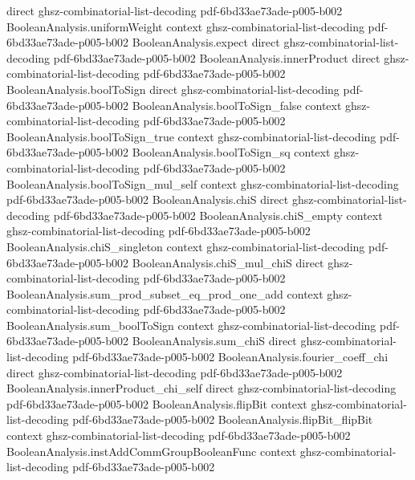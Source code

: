\begin{lemma}
  {direct}
  {ghsz-combinatorial-list-decoding}
  {pdf-6bd33ae73ade-p005-b002}
\proofstep
  {BooleanAnalysis.uniformWeight}
  {context}
  {ghsz-combinatorial-list-decoding}
  {pdf-6bd33ae73ade-p005-b002}
\proofstep
  {BooleanAnalysis.expect}
  {direct}
  {ghsz-combinatorial-list-decoding}
  {pdf-6bd33ae73ade-p005-b002}
\proofstep
  {BooleanAnalysis.innerProduct}
  {direct}
  {ghsz-combinatorial-list-decoding}
  {pdf-6bd33ae73ade-p005-b002}
\proofstep
  {BooleanAnalysis.boolToSign}
  {direct}
  {ghsz-combinatorial-list-decoding}
  {pdf-6bd33ae73ade-p005-b002}
\proofstep
  {BooleanAnalysis.boolToSign_false}
  {context}
  {ghsz-combinatorial-list-decoding}
  {pdf-6bd33ae73ade-p005-b002}
\proofstep
  {BooleanAnalysis.boolToSign_true}
  {context}
  {ghsz-combinatorial-list-decoding}
  {pdf-6bd33ae73ade-p005-b002}
\proofstep
  {BooleanAnalysis.boolToSign_sq}
  {context}
  {ghsz-combinatorial-list-decoding}
  {pdf-6bd33ae73ade-p005-b002}
\proofstep
  {BooleanAnalysis.boolToSign_mul_self}
  {context}
  {ghsz-combinatorial-list-decoding}
  {pdf-6bd33ae73ade-p005-b002}
\proofstep
  {BooleanAnalysis.chiS}
  {direct}
  {ghsz-combinatorial-list-decoding}
  {pdf-6bd33ae73ade-p005-b002}
\proofstep
  {BooleanAnalysis.chiS_empty}
  {context}
  {ghsz-combinatorial-list-decoding}
  {pdf-6bd33ae73ade-p005-b002}
\proofstep
  {BooleanAnalysis.chiS_singleton}
  {context}
  {ghsz-combinatorial-list-decoding}
  {pdf-6bd33ae73ade-p005-b002}
\proofstep
  {BooleanAnalysis.chiS_mul_chiS}
  {direct}
  {ghsz-combinatorial-list-decoding}
  {pdf-6bd33ae73ade-p005-b002}
\proofstep
  {BooleanAnalysis.sum_prod_subset_eq_prod_one_add}
  {context}
  {ghsz-combinatorial-list-decoding}
  {pdf-6bd33ae73ade-p005-b002}
\proofstep
  {BooleanAnalysis.sum_boolToSign}
  {context}
  {ghsz-combinatorial-list-decoding}
  {pdf-6bd33ae73ade-p005-b002}
\proofstep
  {BooleanAnalysis.sum_chiS}
  {direct}
  {ghsz-combinatorial-list-decoding}
  {pdf-6bd33ae73ade-p005-b002}
\proofstep
  {BooleanAnalysis.fourier_coeff_chi}
  {direct}
  {ghsz-combinatorial-list-decoding}
  {pdf-6bd33ae73ade-p005-b002}
\proofstep
  {BooleanAnalysis.innerProduct_chi_self}
  {direct}
  {ghsz-combinatorial-list-decoding}
  {pdf-6bd33ae73ade-p005-b002}
\proofstep
  {BooleanAnalysis.flipBit}
  {context}
  {ghsz-combinatorial-list-decoding}
  {pdf-6bd33ae73ade-p005-b002}
\proofstep
  {BooleanAnalysis.flipBit_flipBit}
  {context}
  {ghsz-combinatorial-list-decoding}
  {pdf-6bd33ae73ade-p005-b002}
\proofstep
  {BooleanAnalysis.instAddCommGroupBooleanFunc}
  {context}
  {ghsz-combinatorial-list-decoding}
  {pdf-6bd33ae73ade-p005-b002}
\proofstep

\end{lemma}
